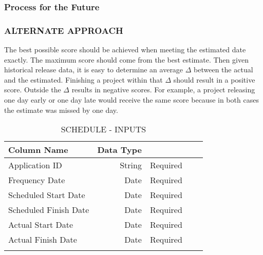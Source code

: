 \documentclass[SDSUThesis.tex]{subfiles}
\begin{document}
    \subsubsection{Process for the Future}
    
    \subsubsection{ALTERNATE APPROACH}
    The best possible score should be achieved
            when meeting the estimated date exactly.  The maximum score
            should come from the best estimate.  Then given historical
            release data, it is easy to determine an 
            average $\Delta$ between the actual and the estimated.  
            Finishing a project within that $\Delta$ should result 
            in a positive score.  Outside the $\Delta$ results in
            negative scores.  For example, a project releasing
            one day early or one day late would receive the same score
            because in both cases the estimate was missed by one day.


\begin{longtable}{@{}l rr rr}

\toprule%
 \centering%
 {\bfseries Column Name}
 & {\bfseries Data Type}
 &  \\

\cmidrule[0.4pt](r{0.125em}){1-1}%
\cmidrule[0.4pt](lr{0.125em}){2-2}%
\cmidrule[0.4pt](l{0.125em}){3-3}%
\endhead

Application ID & String  & Required \\
\myrowcolour%
Frequency Date & Date & Required \\
Scheduled Start Date & Date & Required \\
\myrowcolour%
Scheduled Finish Date & Date & Required \\
Actual Start Date & Date  & Required \\
\myrowcolour%
Actual Finish Date & Date  & Required \\

\bottomrule

\caption{SCHEDULE - INPUTS}
\label{tab:sched}
\end{longtable}
\end{document}
